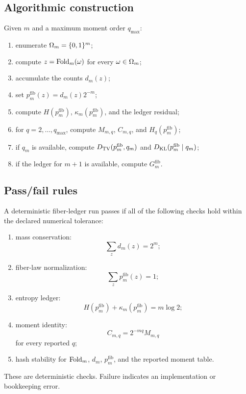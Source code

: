 \subsection{Algorithmic construction}

\begin{definition}
\label{def:exact-fiber-ledger-construction}
Given \(m\) and a maximum moment order \(q_{\max}\):
\begin{enumerate}[leftmargin=2em]
\item enumerate \(\Omega_m=\{0,1\}^m\);
\item compute \(z=\operatorname{Fold}_m(\omega)\) for every \(\omega\in\Omega_m\);
\item accumulate the counts \(d_m(z)\);
\item set \(p_m^{\mathrm{fib}}(z)=d_m(z)2^{-m}\);
\item compute \(H(p_m^{\mathrm{fib}})\), \(\kappa_m(p_m^{\mathrm{fib}})\), and the ledger residual;
\item for \(q=2,\ldots,q_{\max}\), compute \(M_{m,q}\), \(C_{m,q}\), and \(H_q(p_m^{\mathrm{fib}})\);
\item if \(q_m\) is available, compute \(D_{\mathrm{TV}}(p_m^{\mathrm{fib}},q_m)\) and \(D_{\mathrm{KL}}(p_m^{\mathrm{fib}}\mid q_m)\);
\item if the ledger for \(m+1\) is available, compute \(G_m^{\mathrm{fib}}\).
\end{enumerate}
\end{definition}

\subsection{Pass/fail rules}

A deterministic fiber-ledger run passes if all of the following checks hold within the declared numerical tolerance:
\begin{enumerate}[leftmargin=2em]
\item mass conservation:
\[
\sum_z d_m(z)=2^m;
\]
\item fiber-law normalization:
\[
\sum_zp_m^{\mathrm{fib}}(z)=1;
\]
\item entropy ledger:
\[
H(p_m^{\mathrm{fib}})+\kappa_m(p_m^{\mathrm{fib}})=m\log2;
\]
\item moment identity:
\[
C_{m,q}=2^{-mq}M_{m,q}
\]
for every reported \(q\);
\item hash stability for \(\operatorname{Fold}_m\), \(d_m\), \(p_m^{\mathrm{fib}}\), and the reported moment table.
\end{enumerate}
These are deterministic checks.  Failure indicates an implementation or bookkeeping error.

